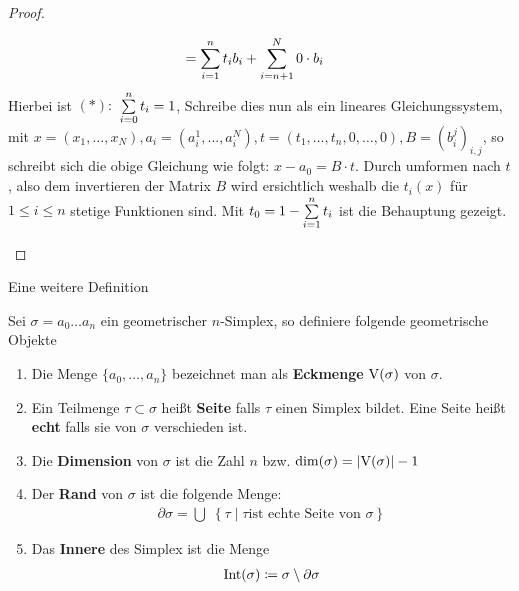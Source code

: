 \begin{Lem}
\begin{proof}
\begin{description}
\begin{align*}
                &= \sp{1}{n} t_i b_i + \sp{n+1}{N} 0 \cdot b_i
      \end{align*}
      Hierbei ist $(*):$ $\sp{0}{n} t_i = 1$, Schreibe dies nun als
      ein lineares Gleichungssystem, mit
      $x=(x_1,\ldots,x_N),a_i=(a_i^1,\ldots,a_i^N),t=(t_1,\ldots,t_n,0,\ldots,0),B=(b_i^j)_{i,j}$,
      so schreibt sich die obige Gleichung wie folgt:
      $x-a_0 = B\cdot t$. Durch umformen nach $t$, also dem
      invertieren der Matrix $B$ wird ersichtlich weshalb die $t_i(x)$
      für $1 \leq i \leq n$ stetige Funktionen sind. Mit
      $t_0 = 1 - \sp{1}{n} t_i$ ist die Behauptung gezeigt.
    \end{description}
  \end{proof}
\end{Lem}

Eine weitere Definition

\begin{Def}
  Sei $\sigma = a_0 \ldots a_n$ ein geometrischer $n$-Simplex, so
  definiere folgende geometrische Objekte
  \begin{enumerate}[\textbullet]%
  \item Die Menge $\{ a_0 , \ldots , a_n \}$ bezeichnet man als
    \textbf{Eckmenge} $\V(\sigma)$ von $\sigma$.
  \item Ein Teilmenge $\tau \subset \sigma$ heißt \textbf{Seite} falls
    $\tau$ einen Simplex bildet. Eine Seite heißt \textbf{echt} falls
    sie von $\sigma$ verschieden ist.
	\item Die \textbf{Dimension} von $\sigma$ ist die Zahl $n$ bzw. 
		$\dim(\sigma) = \gr{\V(\sigma)} - 1$
  \item Der \textbf{Rand} von $\sigma$ ist die folgende Menge:
    \begin{gather*}
      \partial\sigma = \bigcup \; \left\{ \tau \; \Big| \; \tau \text{
          ist echte Seite von } \sigma \right\}
    \end{gather*}
  \item Das \textbf{Innere} des Simplex ist die Menge
    \begin{gather*}
    	\Int(\sigma) \coloneqq \sigma \setminus \partial\sigma
    \end{gather*}
  \end{enumerate}
\end{Def}

